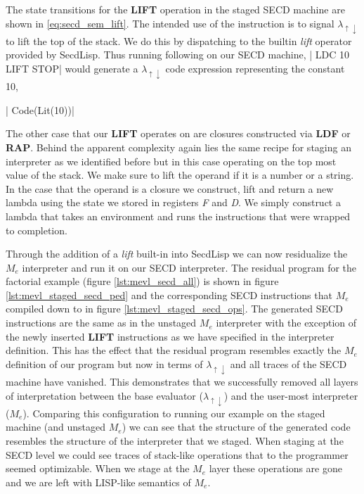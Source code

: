 \documentclass[a4paper,12pt,twoside,openright]{report}
\theoremstyle{definition}
\newcommand{\mslang}{$\lambda_{\uparrow\downarrow}$}
\newcommand{\mevl}{$M_{e}$}
\newcommand{\secdlisp}{SecdLisp}
\begin{document}
The state transitions for the \textbf{LIFT} operation in the staged SECD machine are shown in \eqref{eq:secd_sem_lift}. The intended use of the instruction is to signal \mslang{} to lift the top of the stack. We do this by dispatching to the builtin \textit{lift} operator provided by \secdlisp. Thus running following on our SECD machine, |   LDC 10 LIFT STOP| would generate a \mslang{} code expression representing the constant 10,

|    Code(Lit(10))|

The other case that our \textbf{LIFT} operates on are closures constructed via \textbf{LDF} or \textbf{RAP}. Behind the apparent complexity again lies the same recipe for staging an interpreter as we identified before but in this case operating on the top most value of the stack. We make sure to lift the operand if it is a number or a string. In the case that the operand is a closure we construct, lift and return a new lambda using the state we stored in registers \textit{F} and \textit{D}. We simply construct a lambda that takes an environment and runs the instructions that were wrapped to completion.

Through the addition of a \textit{lift} built-in into \secdlisp{} we can now residualize the \mevl{} interpreter and run it on our SECD interpreter. The residual program for the factorial example (figure \ref{lst:mevl_secd_all}) is shown in figure \ref{lst:mevl_staged_secd_ped} and the corresponding SECD instructions that \mevl{} compiled down to in figure \ref{lst:mevl_staged_secd_ops}. The generated SECD instructions are the same as in the unstaged \mevl{} interpreter with the exception of the newly inserted \textbf{LIFT} instructions as we have specified in the interpreter definition. This has the effect that the residual program resembles exactly the \mevl{} definition of our program but now in terms of \mslang{} and all traces of the SECD machine have vanished. This demonstrates that we successfully removed all layers of interpretation between the base evaluator (\mslang{}) and the user-most interpreter (\mevl{}). Comparing this configuration to running our example on the staged machine (and unstaged \mevl{}) we can see that the structure of the generated code resembles the structure of the interpreter that we staged. When staging at the SECD level we could see traces of stack-like operations that to the programmer seemed optimizable. When we stage at the \mevl{} layer these operations are gone and we are left with LISP-like semantics of \mevl{}.
\end{document}
